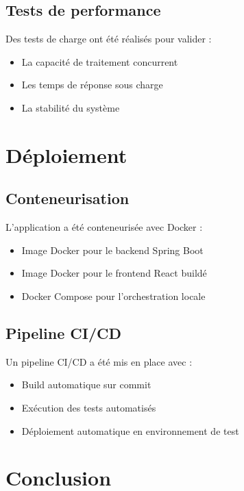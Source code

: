 \documentclass[12pt,a4paper]{report}
\begin{document}
\subsection{Tests de performance}

Des tests de charge ont été réalisés pour valider :

\begin{itemize}
    \item La capacité de traitement concurrent
    \item Les temps de réponse sous charge
    \item La stabilité du système
\end{itemize}

\section{Déploiement}

\subsection{Conteneurisation}

L'application a été conteneurisée avec Docker :

\begin{itemize}
    \item Image Docker pour le backend Spring Boot
    \item Image Docker pour le frontend React buildé
    \item Docker Compose pour l'orchestration locale
\end{itemize}

\subsection{Pipeline CI/CD}

Un pipeline CI/CD a été mis en place avec :

\begin{itemize}
    \item Build automatique sur commit
    \item Exécution des tests automatisés
    \item Déploiement automatique en environnement de test
\end{itemize}

\section{Conclusion}
\end{document}
